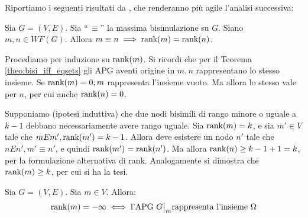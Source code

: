 Riportiamo i seguenti risultati da \cite{dovier}, che renderanno più agile l'analisi successiva:
\begin{proposition} \label{prop:rank_bisi_imp_wf}
    Sia $G = (V,E)$. Sia ``\,$\equiv$'' la massima bisimulazione su $G$. Siano $m,n \in WF(G)$. Allora $m \equiv n \implies \textup{rank}(m) = \textup{rank}(n)$.
\end{proposition}
\begin{proof2}
    Procediamo per induzione su $\textup{rank}(m)$. Si ricordi che per il Teorema \ref{theo:bisi_iff_eqsets} gli APG aventi origine in $m,n$ rappresentano lo stesso insieme. Se $\textup{rank}(m) = 0, m$ rappresenta l'insieme vuoto. Ma allora lo stesso vale per $n$, per cui anche $\textup{rank}(n) = 0$.

    Supponiamo (ipotesi induttiva) che due nodi bisimili di rango minore o uguale a $k-1$ debbano necessariamente avere rango uguale. Sia $\textup{rank}(m) = k$, e sia $m' \in V$ tale che $m E m', \textup{rank}(m') = k-1$. Allora deve esistere un nodo $n'$ tale che $n E n', m' \equiv n'$, e quindi $\textup{rank}(m') = \textup{rank}(n')$. Ma allora $\textup{rank}(n) \geq k-1 + 1 = k$, per la formulazione alternativa di rank. Analogamente si dimostra che $\textup{rank}(m) \geq k$, per cui si ha la tesi.
\end{proof2}
\begin{proposition}
    \label{prop:omega_rank}
    Sia $G = (V,E)$. Sia $m \in V$. Allora:
    \begin{gather*}
        \rankfunc(m) = -\infty \iff \text{l'APG } \restr{G}{m} \text{rappresenta l'insieme } \Omega
    \end{gather*}
\end{proposition}
